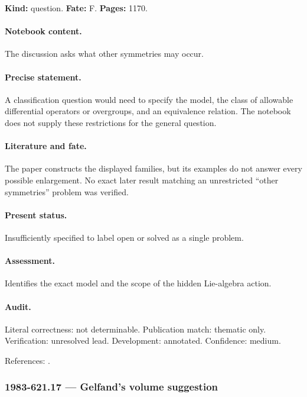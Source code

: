 \label{item:1983-621.16}

\noindent\textbf{Kind:} question. \textbf{Fate:} F. \textbf{Pages:} 1170.\par

\paragraph{Notebook content.} The discussion asks what other symmetries may occur.

\paragraph{Precise statement.} A classification question would need to specify the model, the class of allowable differential operators or overgroups, and an equivalence relation. The notebook does not supply these restrictions for the general question.

\paragraph{Literature and fate.} The paper constructs the displayed families, but its examples do not answer every possible enlargement. No exact later result matching an unrestricted “other symmetries” problem was verified.

\paragraph{Present status.} Insufficiently specified to label open or solved as a single problem.

\paragraph{Assessment.} Identifies the exact model and the scope of the hidden Lie-algebra action.

\paragraph{Audit.} Literal correctness: not determinable. Publication match: thematic only. Verification: unresolved lead. Development: annotated. Confidence: medium.

\noindent References: \citep{gelfandzelevinsky1984models}.\par

\subsubsection{1983-621.17 --- Gelfand’s volume suggestion}

